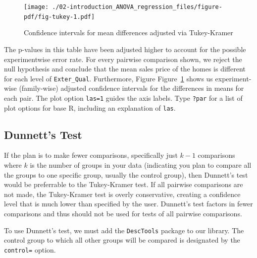 \documentclass[
  letterpaper,
  DIV=11,
  numbers=noendperiod]{scrreprt}
\newenvironment{Shaded}{\begin{snugshade}}{\end{snugshade}}
\newcommand{\AttributeTok}[1]{\textcolor[rgb]{0.40,0.45,0.13}{#1}}
\newcommand{\FunctionTok}[1]{\textcolor[rgb]{0.28,0.35,0.67}{#1}}
\newcommand{\NormalTok}[1]{\textcolor[rgb]{0.00,0.23,0.31}{#1}}
\newcommand{\SpecialCharTok}[1]{\textcolor[rgb]{0.37,0.37,0.37}{#1}}
\newcommand{\StringTok}[1]{\textcolor[rgb]{0.13,0.47,0.30}{#1}}
\begin{document}
\begin{figure}[H]

{\centering \texttt{[image: ./02-introduction\_ANOVA\_regression\_files/figure-pdf/fig-tukey-1.pdf]}

}

\caption{\label{fig-tukey}Confidence intervals for mean differences
adjusted via Tukey-Kramer}

\end{figure}

The p-values in this table have been adjusted higher to account for the
possible experimentwise error rate. For every pairwise comparison shown,
we reject the null hypothesis and conclude that the mean sales price of
the homes is different for each level of \texttt{Exter\_Qual}.
Furthermore, Figure Figure~\ref{fig-tukey} shows us experiment-wise
(family-wise) adjusted confidence intervals for the differences in means
for each pair. The plot option \texttt{las=1} guides the axis labels.
Type \texttt{?par} for a list of plot options for base R, including an
explanation of \texttt{las}.

\hypertarget{sec-dunnett}{%
\subsection{Dunnett's Test}\label{sec-dunnett}}

If the plan is to make fewer comparisons, specifically just \(k-1\)
comparisons where \(k\) is the number of groups in your data (indicating
you plan to compare all the groups to one specific group, usually the
control group), then Dunnett's test would be preferrable to the
Tukey-Kramer test. If all pairwise comparisons are not made, the
Tukey-Kramer test is overly conservative, creating a confidence level
that is much lower than specified by the user. Dunnett's test factors in
fewer comparisons and thus should not be used for tests of all pairwise
comparisons.

To use Dunnett's test, we must add the \texttt{DescTools} package to our
library. The control group to which all other groups will be compared is
designated by the \texttt{control=} option.

\begin{Shaded}
\end{Shaded}
\end{document}
